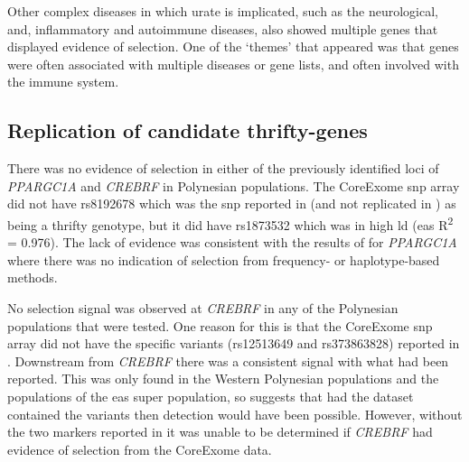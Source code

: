 \documentclass[twoside,openright]{report}
\begin{document}
Other complex diseases in which urate is implicated, such as the
neurological, and, inflammatory and autoimmune diseases, also showed
multiple genes that displayed evidence of selection. One of the `themes'
that appeared was that genes were often associated with multiple
diseases or gene lists, and often involved with the immune system.

\subsection{Replication of candidate
thrifty-genes}\label{replication-of-candidate-thrifty-genes}

There was no evidence of selection in either of the previously
identified loci of \emph{PPARGC1A} and \emph{CREBRF} in Polynesian
populations. The CoreExome \gls{snp} array did not have rs8192678 which
was the \gls{snp} reported in \citet{Myles2011} (and not replicated in
\citet{Cadzow2016}) as being a thrifty genotype, but it did have
rs1873532 which was in high \gls{ld} (\gls{eas} R\textsuperscript{2} =
0.976). The lack of evidence was consistent with the results of
\citet{Cadzow2016} for \emph{PPARGC1A} where there was no indication of
selection from frequency- or haplotype-based methods.

No selection signal was observed at \emph{CREBRF} in any of the
Polynesian populations that were tested. One reason for this is that the
CoreExome \gls{snp} array did not have the specific variants (rs12513649
and rs373863828) reported in \citet{Minster2016}. Downstream from
\emph{CREBRF} there was a consistent signal with what had been reported.
This was only found in the Western Polynesian populations and the
populations of the \gls{eas} super population, so suggests that had the
dataset contained the variants then detection would have been possible.
However, without the two markers reported in \citet{Minster2016} it was
unable to be determined if \emph{CREBRF} had evidence of selection from
the CoreExome data.
\end{document}
